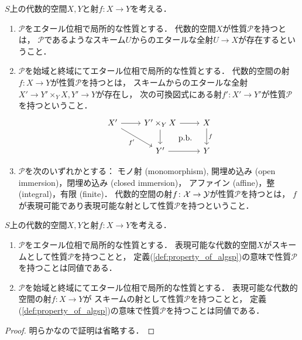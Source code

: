     \begin{Def}\label{def:property_of_algsp}
        $S$上の代数的空間$X,Y$と射$f \colon X \to Y$を考える．
    \begin{enumerate}[label=(\roman*)]
    \item
        $\mathcal{P}$をエタール位相で局所的な性質とする．
        代数的空間$X$が性質$\mathcal{P}$を持つとは，
        $\mathcal{P}$であるようなスキーム$U$からのエタールな全射$U \to X$が存在するということ．
    \item
        $\mathcal{P}$を始域と終域にてエタール位相で局所的な性質とする．
        代数的空間の射$f \colon X \to Y$が性質$\mathcal{P}$を持つとは，
        スキームからのエタールな全射$X' \to Y' \times_{Y} X, Y' \to Y$が存在し，
        次の可換図式にある射$f' \colon X' \to Y'$が性質$\mathcal{P}$を持つということ．
        \[
        \begin{tikzcd}
            X' \ar[r] \ar[rd, "f'"']& Y' \times_{Y} X \ar[r]\ar[d]& X \ar[d, "f"]\\
            {} & Y' \ar[r]& Y \ar[lu, phantom, "\text{p.b.}"]
        \end{tikzcd}
        \]
    \item
        $\mathcal{P}$を次のいずれかとする：
        モノ射 (monomorphism), 開埋め込み (open immersion)，閉埋め込み (closed immersion)，
        アファイン (affine)，整 (integral)，有限 (finite)．
        代数的空間の射$f \colon \mathcal{X} \to \mathcal{Y}$が性質$\mathcal{P}$を持つとは，
        $f$が表現可能であり表現可能な射として性質$\mathcal{P}$を持つということ．
    \end{enumerate}
    \end{Def}

    \begin{Lemma}
        $S$上の代数的空間$X,Y$と射$f \colon X \to Y$を考える．
        \begin{enumerate}[label=(\roman*)]
        \item
            $\mathcal{P}$をエタール位相で局所的な性質とする．
            表現可能な代数的空間$X$がスキームとして性質$\mathcal{P}$を持つことと，
            定義(\ref{def:property_of_algsp})の意味で性質$\mathcal{P}$を持つことは同値である．
        \item
            $\mathcal{P}$を始域と終域にてエタール位相で局所的な性質とする．
            表現可能な代数的空間の射$f \colon X \to Y$が
            スキームの射として性質$\mathcal{P}$を持つことと，
            定義(\ref{def:property_of_algsp})の意味で性質$\mathcal{P}$を持つことは同値である．
        \end{enumerate}
    \end{Lemma}
    \begin{proof}
        明らかなので証明は省略する．
    \end{proof}

